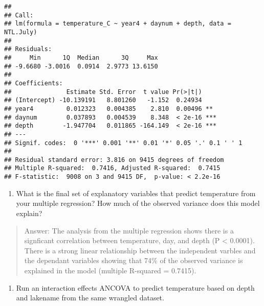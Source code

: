 \documentclass[]{article}
\newenvironment{Shaded}{\begin{snugshade}}{\end{snugshade}}
\newcommand{\CommentTok}[1]{\textcolor[rgb]{0.56,0.35,0.01}{\textit{#1}}}
\newcommand{\DataTypeTok}[1]{\textcolor[rgb]{0.13,0.29,0.53}{#1}}
\newcommand{\KeywordTok}[1]{\textcolor[rgb]{0.13,0.29,0.53}{\textbf{#1}}}
\newcommand{\NormalTok}[1]{#1}
\newcommand{\OperatorTok}[1]{\textcolor[rgb]{0.81,0.36,0.00}{\textbf{#1}}}
\newcommand{\StringTok}[1]{\textcolor[rgb]{0.31,0.60,0.02}{#1}}
\providecommand{\tightlist}{%
  \setlength{\itemsep}{0pt}\setlength{\parskip}{0pt}}
\begin{document}
\begin{verbatim}
## 
## Call:
## lm(formula = temperature_C ~ year4 + daynum + depth, data = NTL.July)
## 
## Residuals:
##     Min      1Q  Median      3Q     Max 
## -9.6680 -3.0016  0.0914  2.9773 13.6150 
## 
## Coefficients:
##               Estimate Std. Error  t value Pr(>|t|)    
## (Intercept) -10.139191   8.801260   -1.152  0.24934    
## year4         0.012323   0.004385    2.810  0.00496 ** 
## daynum        0.037893   0.004539    8.348  < 2e-16 ***
## depth        -1.947704   0.011865 -164.149  < 2e-16 ***
## ---
## Signif. codes:  0 '***' 0.001 '**' 0.01 '*' 0.05 '.' 0.1 ' ' 1
## 
## Residual standard error: 3.816 on 9415 degrees of freedom
## Multiple R-squared:  0.7416, Adjusted R-squared:  0.7415 
## F-statistic:  9008 on 3 and 9415 DF,  p-value: < 2.2e-16
\end{verbatim}

\begin{enumerate}
\def\labelenumi{\arabic{enumi}.}
\setcounter{enumi}{4}
\tightlist
\item
  What is the final set of explanatory variables that predict
  temperature from your multiple regression? How much of the observed
  variance does this model explain?
\end{enumerate}

\begin{quote}
Answer: The analysis from the multiple regression shows there is a
signficant correlation between temperature, day, and depth (P
\textless{} 0.0001). There is a strong linear relationship between the
independent varbles and the dependant variables showing that 74\% of the
observed variance is explained in the model (multiple R-squared =
0.7415).
\end{quote}

\begin{enumerate}
\def\labelenumi{\arabic{enumi}.}
\setcounter{enumi}{5}
\tightlist
\item
  Run an interaction effects ANCOVA to predict temperature based on
  depth and lakename from the same wrangled dataset.
\end{enumerate}

\begin{Shaded}
\end{Shaded}
\end{document}
